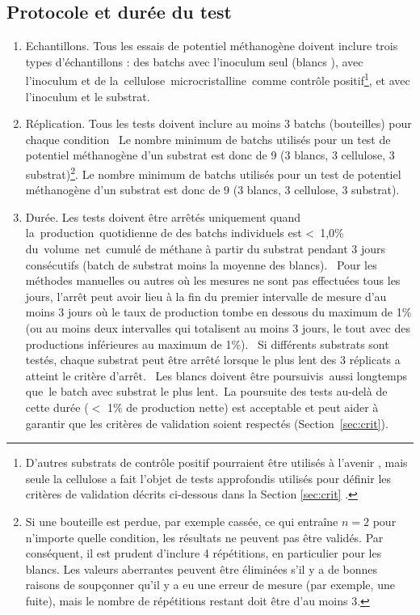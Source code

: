 \documentclass[]{article}
\begin{document}
\subsection{Protocole et durée du test}
\label{sec:setup}
\begin{enumerate}
  \item Echantillons. 
    Tous les essais de potentiel méthanogène doivent inclure trois types d’échantillons : des batchs avec l’inoculum seul (\guillemotleft blancs \guillemotright), avec l’inoculum et de la cellulose microcristalline comme contrôle positif\footnote{D'autres substrats de contrôle positif pourraient être utilisés à l'avenir \citep{kochEvaluationCommonSupermarket2020}, mais seule la cellulose a fait l'objet de tests approfondis utilisés pour définir les critères de validation décrits ci-dessous dans la Section \ref{sec:crit} \citep{hafnerImprovingInterlaboratoryReproducibility2020}.
    }, et avec l’inoculum et le substrat.
    \item Réplication. 
Tous les tests doivent inclure au moins 3 batchs (bouteilles) pour chaque condition 
    Le nombre minimum de batchs utilisés pour un test de potentiel méthanogène d’un substrat est donc de 9 (3 blancs, 3 cellulose, 3 substrat)\footnote{
      Si une bouteille est perdue, par exemple cassée, ce qui entraîne $ n = 2 $ pour n'importe quelle condition, les résultats ne peuvent pas être validés.
      Par conséquent, il est prudent d'inclure 4 répétitions, en particulier pour les blancs.
      Les valeurs aberrantes peuvent être éliminées s'il y a de bonnes raisons de soupçonner qu'il y a eu une erreur de mesure (par exemple, une fuite), mais le nombre de répétitions restant doit être d'au moins 3.
    }.
Le nombre minimum de batchs utilisés pour un test de potentiel méthanogène d’un substrat est donc de 9 (3 blancs, 3 cellulose, 3 substrat).
  \item Durée. 
    Les tests doivent être arrêtés uniquement quand la production quotidienne de  des batchs individuels est < 1,0\% du volume net cumulé de méthane à partir du substrat pendant 3 jours consécutifs (batch de substrat moins la moyenne des blancs).  
    Pour les méthodes manuelles ou autres où les mesures ne sont pas effectuées tous les jours, l’arrêt peut avoir lieu à la fin du premier intervalle de mesure d'au moins 3 jours où le taux de production tombe en dessous du maximum de 1\% (ou au moins deux intervalles qui totalisent au moins 3 jours, le tout avec des productions inférieures au maximum de 1\%). 
    Si différents substrats sont testés, chaque substrat peut être arrêté lorsque le plus lent des 3 réplicats a atteint le critère d’arrêt. 
    Les blancs doivent être poursuivis aussi longtemps que le batch avec substrat le plus lent. La poursuite des tests au-delà de cette durée ($<$ 1\% de production nette) est acceptable et peut aider à garantir que les critères de validation soient respectés (Section \ref{sec:crit}).
\end{enumerate}
\end{document}
